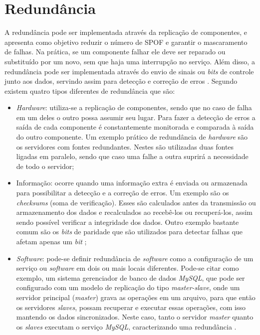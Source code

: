 \section{Redundância}
\label{section:redundancia}

A redundância pode ser implementada através da replicação de componentes, e apresenta como objetivo reduzir o número de \ac{SPOF} e garantir 
o mascaramento de falhas. Na prática, se um componente falhar ele deve ser reparado ou substituído por um novo, sem que haja uma 
interrupção no serviço. Além disso, a redundância pode ser implementada através do envio de sinais ou \textit{bits} de controle junto aos dados, 
servindo assim para detecção e correção de erros \cite{weber2002}. Segundo \cite{norvag2000} existem quatro tipos diferentes 
de redundância que são:
\begin{itemize}
 \item \textit{Hardware}: utiliza-se a replicação de componentes, sendo que no caso de falha em um deles o outro possa assumir seu lugar. 
 Para fazer a detecção de erros a saída de cada componente é constantemente monitorada e comparada à saída do outro componente.
 Um exemplo prático de redundância de \textit{hardware} são os servidores com fontes redundantes. Nestes são utilizadas duas fontes ligadas 
 em paralelo, sendo que caso uma falhe a outra suprirá a necessidade de todo o servidor;
 \item Informação: ocorre quando uma informação extra é enviada ou armazenada para possibilitar a detecção e a correção de erros.
 Um exemplo são os \textit{checksums} (soma de verificação). Esses são calculados antes da transmissão ou armazenamento dos dados 
 e recalculados ao recebê-los ou recuperá-los, assim sendo possível verificar a integridade dos dados. Outro exemplo bastante comum são os 
 \textit{bits} de paridade que são utilizados para detectar falhas que afetam apenas um \textit{bit} \cite{weber2002};
 \item \textit{Software}: pode-se definir redundância de \textit{software} como a configuração de um serviço ou \textit{software} em
 dois ou mais locais diferentes. Pode-se citar como exemplo, um sistema gerenciador de banco de dados \textit{MySQL}, que pode ser configurado 
 com um modelo de replicação do tipo \textit{master-slave}, onde um servidor principal (\textit{master}) grava as operações em um arquivo, 
 para que então os servidores \textit{slaves}, possam recuperar e executar essas operações, com isso mantendo os dados sincronizados. Neste caso, 
 tanto o servidor \textit{master} quanto os \textit{slaves} executam o serviço \textit{MySQL}, caracterizando uma redundância \cite{viana201}. 

\end{itemize}
